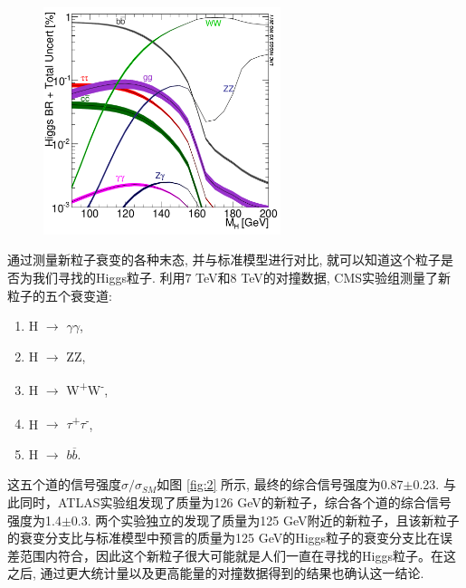 \documentclass{SCIS2020cn}
\begin{document}
\begin{figure}[!t]
\centering
\includegraphics[width=2.72396in]{Figure-1.pdf}
\label{fig:1}
\end{figure}

通过测量新粒子衰变的各种末态, 并与标准模型进行对比, 就可以知道这个粒子是否为我们寻找的Higgs粒子. 利用7 TeV和8 TeV的对撞数据, CMS实验组测量了新粒子的五个衰变道: 

\begin{enumerate}
\def\labelenumi{\arabic{enumi}.}
\item H $\rightarrow$ $\gamma$$\gamma$,
\item H $\rightarrow$ ZZ,
\item H $\rightarrow$ W\textsuperscript{+}W\textsuperscript{-},
\item H $\rightarrow$ $\tau$\textsuperscript{+}$\tau$\textsuperscript{-},
\item H $\rightarrow$ $b\overline{b}$.
\end{enumerate}

这五个道的信号强度$\sigma/\sigma_{SM}$如图 \ref{fig:2} 所示, 最终的综合信号强度为0.87$\pm$0.23. 与此同时，ATLAS实验组发现了质量为126 GeV的新粒子，综合各个道的综合信号强度为1.4$\pm$0.3. 两个实验独立的发现了质量为125 GeV附近的新粒子，且该新粒子的衰变分支比与标准模型中预言的质量为125 GeV的Higgs粒子的衰变分支比在误差范围内符合，因此这个新粒子很大可能就是人们一直在寻找的Higgs粒子。在这之后, 通过更大统计量以及更高能量的对撞数据得到的结果也确认这一结论. 
\end{document}
